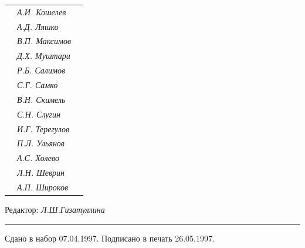 \begin{tabular}{p{63mm}p{40mm}p{50mm}}
                               &   \it А.И. Кошелев  & \\


                               &   \it А.Д. Ляшко  & \\


                               &   \it В.П. Максимов  & \\


                               &   \it Д.Х. Муштари & \\


                               &   \it Р.Б. Салимов  & \\


                               &   \it С.Г. Самко  & \\


                               &   \it В.Н. Скимель &  \\


                               &   \it С.Н. Слугин  & \\


                               &   \it И.Г. Терегулов  & \\


                               &   \it П.Л. Ульянов  & \\


                               &   \it А.С. Холево  & \\


                               &   \it Л.Н. Шеврин  & \\


                               &   \it А.П. Широков & \\


\end{tabular} 


\bigskip 


\bigskip 


\bigskip 





 


\centerline{Редактор: \it Л.Ш.Гизатуллина}


\bigskip 


\hrule 


\setlength{\hoffset}{-23mm}


\bigskip


\noindent Сдано в набор 07.04.1997. Подписано в печать 26.05.1997.


